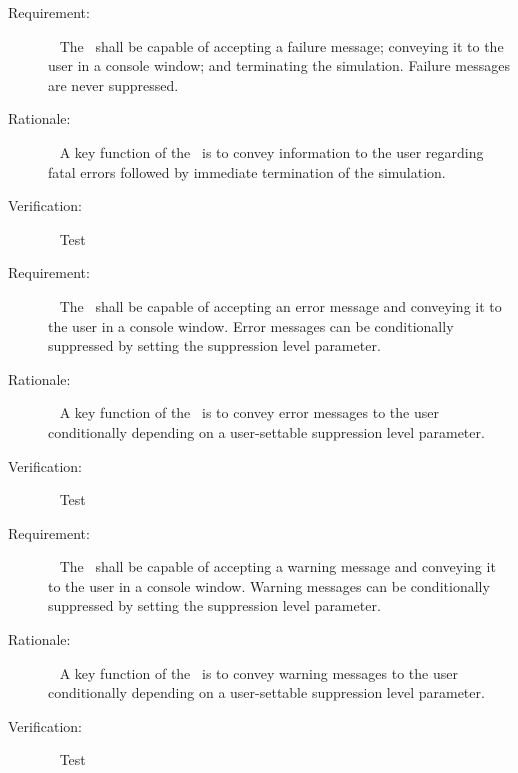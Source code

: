 \label{reqt:FAIL}
\begin{description}
  \item[Requirement:]\ \newline
     The \MessageHandlerDesc\ shall be capable of accepting a failure message; conveying it to the user in a console window; and terminating the simulation.  Failure messages are never suppressed.
  \item[Rationale:]\ \newline
A key function of the \MessageHandlerDesc\ is to convey information to the user
regarding fatal errors followed by immediate termination of the simulation.

  \item[Verification:]\ \newline
    Test
\end{description}

\label{reqt:ERROR}
\begin{description}
  \item[Requirement:]\ \newline
     The \MessageHandlerDesc\ shall be capable of accepting an error message and
conveying it to the user in a console window.  Error messages can be 
conditionally suppressed by setting the suppression level parameter.
  \item[Rationale:]\ \newline
A key function of the \MessageHandlerDesc\ is to convey error messages to the user conditionally depending
on a user-settable suppression level parameter.

  \item[Verification:]\ \newline
    Test
\end{description}

\label{reqt:WARN}
\begin{description}
  \item[Requirement:]\ \newline
     The \MessageHandlerDesc\ shall be capable of accepting a warning message and
conveying it to the user in a console window.  Warning messages can be 
conditionally suppressed by setting the suppression level parameter.
  \item[Rationale:]\ \newline
A key function of the \MessageHandlerDesc\ is to convey warning messages to the user conditionally depending
on a user-settable suppression level parameter.

  \item[Verification:]\ \newline
    Test
\end{description}

